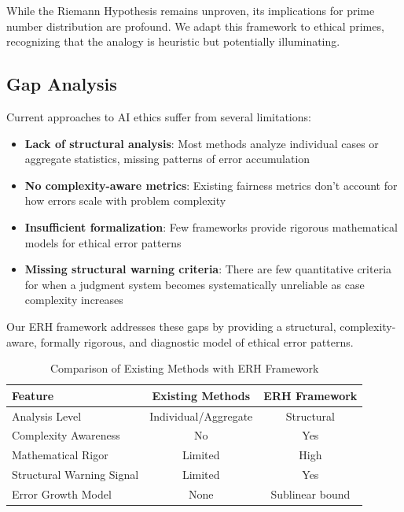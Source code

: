\documentclass[12pt,a4paper]{article}
\theoremstyle{definition}
\theoremstyle{remark}
\begin{document}
While the Riemann Hypothesis remains unproven, its implications for prime number distribution are profound. We adapt this framework to ethical primes, recognizing that the analogy is heuristic but potentially illuminating.

\subsection{Gap Analysis}

Current approaches to AI ethics suffer from several limitations:
\begin{itemize}
    \item \textbf{Lack of structural analysis}: Most methods analyze individual cases or aggregate statistics, missing patterns of error accumulation
    \item \textbf{No complexity-aware metrics}: Existing fairness metrics don't account for how errors scale with problem complexity
    \item \textbf{Insufficient formalization}: Few frameworks provide rigorous mathematical models for ethical error patterns
    \item \textbf{Missing structural warning criteria}: There are few quantitative criteria for when a judgment system becomes systematically unreliable as case complexity increases
\end{itemize}

Our ERH framework addresses these gaps by providing a structural, complexity-aware, formally rigorous, and diagnostic model of ethical error patterns.

\begin{table}[htbp]
\centering
\caption{Comparison of Existing Methods with ERH Framework}
\label{tab:comparison}
\begin{tabular}{lcc}
\toprule
\textbf{Feature} & \textbf{Existing Methods} & \textbf{ERH Framework} \\
\midrule
Analysis Level & Individual/Aggregate & Structural \\
Complexity Awareness & No & Yes \\
Mathematical Rigor & Limited & High \\
Structural Warning Signal & Limited & Yes \\
Error Growth Model & None & Sublinear bound \\
\bottomrule
\end{tabular}
\end{table}

\end{document}
